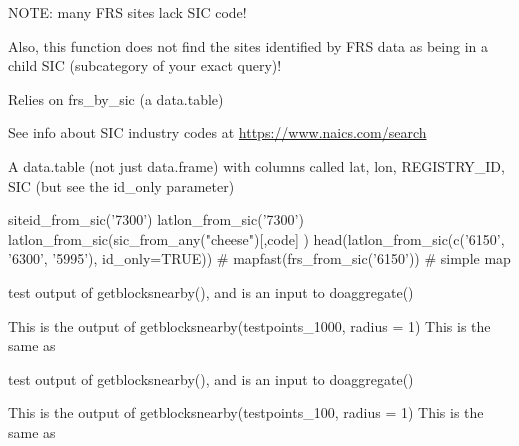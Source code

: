 \documentclass[a4paper]{book}
\begin{document}
%
\begin{Details}\relax
NOTE: many FRS sites lack SIC code!

Also, this function does not find the sites
identified by FRS data as being in a child SIC (subcategory of your exact query)!

Relies on  frs\_by\_sic (a data.table)

See info about SIC industry codes at \url{https://www.naics.com/search}
\end{Details}
%
\begin{Value}
A data.table (not just data.frame) with columns called
lat, lon, REGISTRY\_ID, SIC (but see the id\_only parameter)
\end{Value}
%
\begin{Examples}
\begin{ExampleCode}
  siteid_from_sic('7300')
  latlon_from_sic('7300')
  latlon_from_sic(sic_from_any("cheese")[,code] )
  head(latlon_from_sic(c('6150', '6300', '5995'), id_only=TRUE))
  # mapfast(frs_from_sic('6150')) # simple map
\end{ExampleCode}
\end{Examples}
%
\begin{Description}\relax
test output of getblocksnearby(), and is an input to doaggregate()
\end{Description}
%
\begin{Details}\relax
This is the output of getblocksnearby(testpoints\_1000, radius = 1)
This is the same as  
\end{Details}
%
\begin{SeeAlso}\relax
{}    
\end{SeeAlso}
%
\begin{Description}\relax
test output of getblocksnearby(), and is an input to doaggregate()
\end{Description}
%
\begin{Details}\relax
This is the output of getblocksnearby(testpoints\_100, radius = 1)
This is the same as  
\end{Details}
\end{document}
